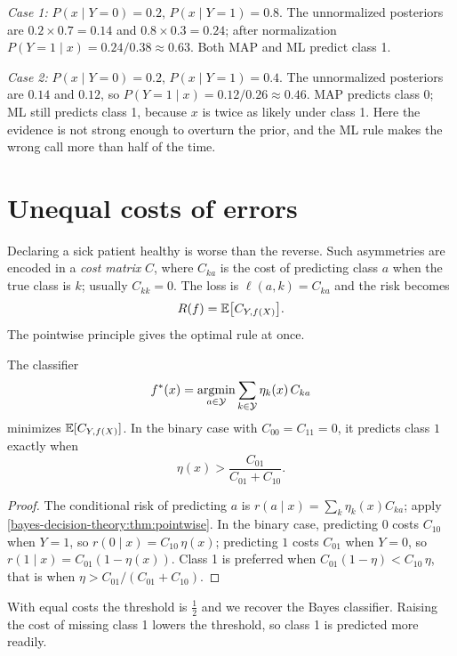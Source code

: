 \begin{notechapter}
\begin{example}
\emph{Case 1:} $P(x \mid Y=0) = 0.2$, $P(x\mid Y=1) = 0.8$. The unnormalized
posteriors are $0.2 \times 0.7 = 0.14$ and $0.8 \times 0.3 = 0.24$; after
normalization $P(Y = 1\mid x) = 0.24/0.38 \approx 0.63$. Both MAP and ML
predict class 1.

\emph{Case 2:} $P(x \mid Y=0) = 0.2$, $P(x\mid Y=1) = 0.4$. The unnormalized
posteriors are $0.14$ and $0.12$, so $P(Y=1\mid x) = 0.12/0.26 \approx 0.46$.
MAP predicts class 0; ML still predicts class 1, because $x$ is twice as
likely under class 1. Here the evidence is not strong enough to overturn the
prior, and the ML rule makes the wrong call more than half of the time.
\end{example}

\section{Unequal costs of errors}\label{bayes-decision-theory:sec:costs}

Declaring a sick patient healthy is worse than the reverse. Such asymmetries
are encoded in a \emph{cost matrix} $C$, where $C_{k a}$ is the cost of
predicting class $a$ when the true class is $k$; usually $C_{kk} = 0$. The loss
is $\ell(a, k) = C_{k a}$ and the risk becomes
\[
  R(f) = \mathbb{E}\bigl[C_{Y, f(X)}\bigr].
\]
The pointwise principle gives the optimal rule at once.

\begin{theorem}\label{bayes-decision-theory:thm:costs}
The classifier
\[
  f^*(x) = \operatorname*{argmin}_{a \in \mathcal{Y}} \sum_{k\in\mathcal{Y}} \eta_k(x)\, C_{k a}
\]
minimizes $\mathbb{E}[C_{Y,f(X)}]$. In the binary case with $C_{00} = C_{11} = 0$, it
predicts class $1$ exactly when
\[
  \eta(x) > \frac{C_{01}}{C_{01} + C_{10}} .
\]
\end{theorem}

\begin{proof}
The conditional risk of predicting $a$ is $r(a\mid x) = \sum_k \eta_k(x) C_{ka}$;
apply \cref{bayes-decision-theory:thm:pointwise}. In the binary case,
predicting $0$ costs $C_{10}$ when $Y = 1$, so $r(0\mid x) = C_{10}\,\eta(x)$;
predicting $1$ costs $C_{01}$ when $Y = 0$, so $r(1\mid x) = C_{01}(1 - \eta(x))$.
Class 1 is preferred when $C_{01}(1-\eta) < C_{10}\,\eta$, that is when
$\eta > C_{01}/(C_{01}+C_{10})$.
\end{proof}

With equal costs the threshold is $\frac12$ and we recover the Bayes
classifier. Raising the cost of missing class 1 lowers the threshold, so
class 1 is predicted more readily.


\end{notechapter}
